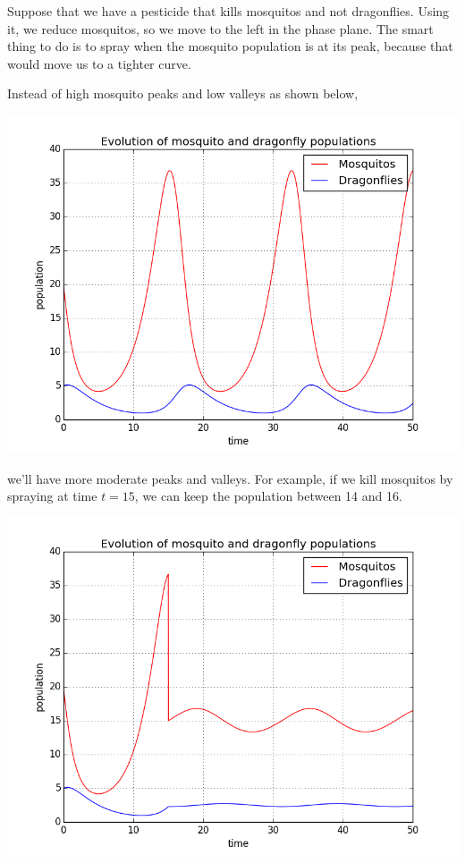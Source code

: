 \documentclass
[justified,nohyper]
{tufte-handout}
\begin{document}
Suppose that we have a pesticide that kills mosquitos and not dragonflies. Using it, we reduce mosquitos, so we move to the left in the phase plane. The smart thing to do is to spray when the mosquito population is at its peak, because that would move us to a tighter curve.

Instead of high mosquito peaks and low valleys as shown below,

\includegraphics[scale=0.5]{pop_mosquitos_and_dragonflies_unregulated.png}

we'll have more moderate peaks and valleys. For example, if we kill mosquitos by spraying at time $t=15$, we can keep the population between 14 and 16.

\includegraphics[scale=0.5]{pop_mosquitos_and_dragonflies_spray_at_peak.png}
\end{document}

